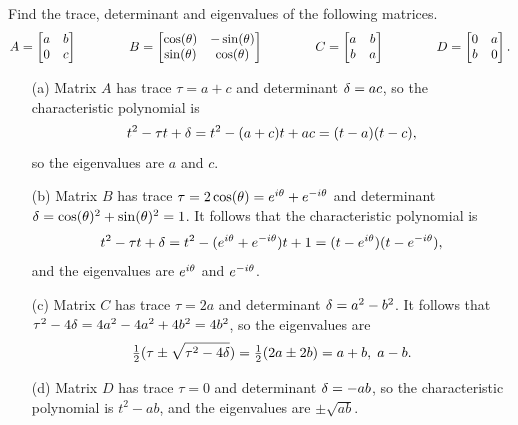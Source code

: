\documentclass[a4paper]{amsart}
\begin{document}
\begin{exercise}\label{ex-spec-a}
 Find the trace, determinant and eigenvalues of the following
 matrices. 
 \[ A = \left[\begin{matrix} a & b \\ 0 & c \end{matrix}\right] \hspace{4em}
    B = \left[\begin{matrix} \cos(\theta) & -\sin(\theta) \\ \sin(\theta) & \cos(\theta)\end{matrix}\right] \hspace{4em}
    C = \left[\begin{matrix} a & b \\ b & a \end{matrix}\right] \hspace{4em}
    D = \left[\begin{matrix} 0 & a \\ b & 0 \end{matrix}\right].
 \]
\end{exercise}
\begin{solution}
 \begin{itemize}
  \item[(a)] Matrix $A$ has trace $\tau=a+c$ and determinant $\delta=ac$,
   so the characteristic polynomial is 
   \[ t^2-\tau t+\delta=t^2-(a+c)t+ac=(t-a)(t-c), \]
   so the eigenvalues are $a$ and $c$.
  \item[(b)] Matrix $B$ has trace
   $\tau=2\cos(\theta)=e^{i\theta}+e^{-i\theta}$ and determinant
   $\delta=\cos(\theta)^2+\sin(\theta)^2=1$.  It follows that the
   characteristic polynomial is 
   \[ t^2-\tau t+\delta= t^2 - (e^{i\theta}+e^{-i\theta})t+1 = 
       (t-e^{i\theta})(t-e^{-i\theta}),
   \]
   and the eigenvalues are $e^{i\theta}$ and $e^{-i\theta}$.
  \item[(c)] Matrix $C$ has trace $\tau=2a$ and determinant
   $\delta=a^2-b^2$.  It follows that $\tau^2-4\delta=4a^2-4a^2+4b^2=4b^2$,
   so the eigenvalues are 
   \[ \tfrac{1}{2}(\tau\pm\sqrt{\tau^2-4\delta}) = \tfrac{1}{2}(2a\pm 2b) = a+b,\;a-b. \]
  \item[(d)] Matrix $D$ has trace $\tau=0$ and determinant $\delta=-ab$,
   so the characteristic polynomial is $t^2-ab$, and the eigenvalues
   are $\pm\sqrt{ab}$.
 \end{itemize}
\end{solution}
\end{document}
